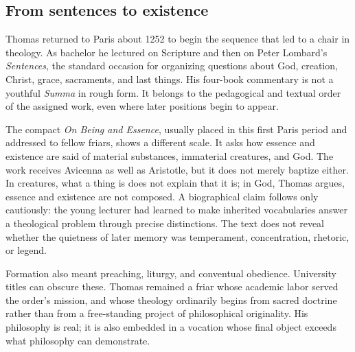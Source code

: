 \subsection{From sentences to existence}

Thomas returned to Paris about 1252 to begin the sequence that led to a chair
in theology.  As bachelor he lectured on Scripture and then on Peter Lombard's
\emph{Sentences}, the standard occasion for organizing questions about God,
creation, Christ, grace, sacraments, and last things.  His four-book commentary
is not a youthful \emph{Summa} in rough form.  It belongs to the pedagogical and
textual order of the assigned work, even where later positions begin to appear.

The compact \emph{On Being and Essence}, usually placed in this first Paris
period and addressed to fellow friars, shows a different scale.  It asks how
essence and existence are said of material substances, immaterial creatures,
and God.  The work receives Avicenna as well as Aristotle, but it does not
merely baptize either.  In creatures, what a thing is does not explain that it
is; in God, Thomas argues, essence and existence are not composed.  A
biographical claim follows only cautiously: the young lecturer had learned to
make inherited vocabularies answer a theological problem through precise
distinctions.  The text does not reveal whether the quietness of later memory
was temperament, concentration, rhetoric, or legend.

Formation also meant preaching, liturgy, and conventual obedience.  University
titles can obscure these.  Thomas remained a friar whose academic labor served
the order's mission, and whose theology ordinarily begins from sacred doctrine
rather than from a free-standing project of philosophical originality.  His
philosophy is real; it is also embedded in a vocation whose final object exceeds
what philosophy can demonstrate.
